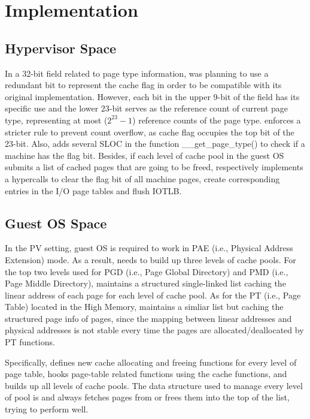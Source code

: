 \section{Implementation} \label{sec:implementation}

\subsection{Hypervisor Space}
In a 32-bit field related to page type information, \name was planning to use a redundant bit to represent the cache flag in order to be compatible with its original implementation. However, each bit in the upper 9-bit of the field has its specific use and the lower 23-bit serves as the reference count of current page type, representing at most ($2^23-1$) reference counts of the page type. \name enforces a stricter rule to prevent count overflow, as cache flag occupies the top bit of the 23-bit. Also, \name adds several SLOC in the function \_\_get\_page\_type() to check if a machine has the flag bit. Besides, if each level of cache pool in the guest OS submits a list of cached pages that are going to be freed, respectively \name implements a hypercalls to clear the flag bit of all machine pages, create corresponding entries in the I/O page tables and flush IOTLB.   

\subsection{Guest OS Space}

In the PV setting, guest OS is required to work in PAE (i.e., Physical Address Extension) mode. As a result, \name needs to build up three levels of cache pools. For the top two levels used for PGD (i.e., Page Global Directory) and PMD (i.e., Page Middle Directory), \name maintains a structured single-linked list caching the linear address of each page for each level of cache pool. As for the PT (i.e., Page Table) located in the High Memory, \name maintains a simliar list but caching the structured page info of pages, since the mapping between linear addresses and physical addresses is not stable every time the pages are allocated/deallocated by PT functions.  

Specifically, \name defines new cache allocating and freeing functions for every level of page table, hooks page-table related functions using the cache functions, and builds up all levels of cache pools. The data structure used to manage every level of pool is  and \name always fetches pages from or frees them into the top of the list, trying to perform well. 

